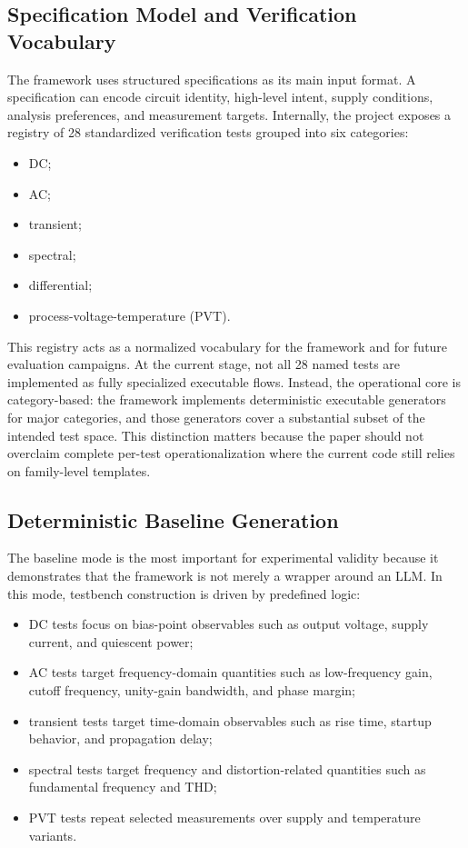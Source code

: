 \documentclass[conference]{IEEEtran}
\begin{document}
\subsection{Specification Model and Verification Vocabulary}
The framework uses structured specifications as its main input format. A specification can encode circuit identity, high-level intent, supply conditions, analysis preferences, and measurement targets. Internally, the project exposes a registry of 28 standardized verification tests grouped into six categories:

\begin{itemize}
\item DC;
\item AC;
\item transient;
\item spectral;
\item differential;
\item process-voltage-temperature (PVT).
\end{itemize}

This registry acts as a normalized vocabulary for the framework and for future evaluation campaigns. At the current stage, not all 28 named tests are implemented as fully specialized executable flows. Instead, the operational core is category-based: the framework implements deterministic executable generators for major categories, and those generators cover a substantial subset of the intended test space. This distinction matters because the paper should not overclaim complete per-test operationalization where the current code still relies on family-level templates.

\subsection{Deterministic Baseline Generation}
The baseline mode is the most important for experimental validity because it demonstrates that the framework is not merely a wrapper around an LLM. In this mode, testbench construction is driven by predefined logic:

\begin{itemize}
\item DC tests focus on bias-point observables such as output voltage, supply current, and quiescent power;
\item AC tests target frequency-domain quantities such as low-frequency gain, cutoff frequency, unity-gain bandwidth, and phase margin;
\item transient tests target time-domain observables such as rise time, startup behavior, and propagation delay;
\item spectral tests target frequency and distortion-related quantities such as fundamental frequency and THD;
\item PVT tests repeat selected measurements over supply and temperature variants.
\end{itemize}
\end{document}
